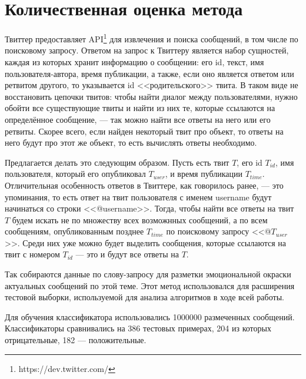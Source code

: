 \section{Количественная оценка метода}\label{compare}

Твиттер предоставляет API\footnote{https://dev.twitter.com/} для извлечения и поиска сообщений, в
том числе по поисковому запросу. Ответом на запрос к Твиттеру является набор сущностей, каждая из
которых хранит информацию о сообщении: его id, текст, имя пользователя-автора,
время публикации, а также, если оно является ответом или ретвитом другого, то указывается id
<<родительского>> твита. В таком виде не восстановить цепочки твитов: чтобы найти диалог
между пользователями, нужно обойти все существующие твиты и найти из них те, которые ссылаются на
определённое сообщение, --- так можно найти все ответы на него или его ретвиты. Скорее всего, если
найден некоторый твит про объект, то ответы на него будут про этот же объект, то есть вычислять
ответы необходимо.

Предлагается делать это следующим образом. Пусть есть твит $T$, его id $T_{id}$, имя пользователя,
который его опубликовал $T_{user}$, и время публикации $T_{time}$. Отличительная особенность ответов
в Твиттере, как говорилось ранее, --- это упоминания, то есть ответ на твит пользователя с именем username
будут начинаться со строки <<@username>>. Тогда, чтобы найти все ответы на твит $T$ будем искать не
по множеству всех возможнных сообщений, а по всем сообщениям, опубликованным позднее $T_{time}$ по
поисковому запросу <<@$T_{user}$>>. Среди них уже можно будет выделить сообщения, которые ссылаются
на твит с номером $T_{id}$ --- это и будут все ответы на $T$.

Так собираются данные по слову-запросу для разметки эмоциональной окраски актуальных сообщений по
этой теме. Этот метод использовался для расширения тестовой выборки, используемой для анализа
алгоритмов в ходе всей работы.

Для обучения классификатора использовались 1000000 размеченных сообщений. Классификаторы сравнивались
на 386 тестовых примерах, 204 из которых отрицательные, 182 --- положительные.

